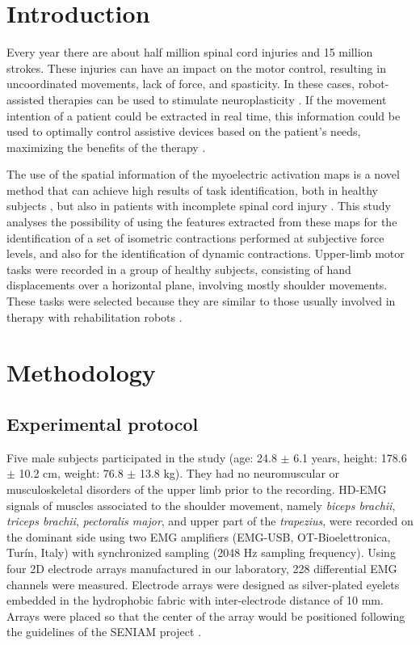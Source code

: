 \section{Introduction}
Every year there are about half million spinal cord injuries and 15 million strokes. These injuries can have an impact on the motor control, resulting in uncoordinated movements, lack of force, and spasticity. In these cases, robot-assisted therapies can be used to stimulate neuroplasticity \citep{vanPepen2004}. If the movement intention of a patient could be extracted in real time, this information could be used to optimally control assistive devices based on the patient's needs, maximizing the benefits of the therapy \citep{Hogan2006}.

The use of the spatial information of the myoelectric activation maps is a novel method that can achieve high results of task identification, both in healthy subjects \citep{Stango2015}, but also in patients with incomplete spinal cord injury \citep{Rojas-Martinez2013, Jordanic2016a, Jordanic2016b}. This study analyses the possibility of using the features extracted from these maps for the identification of a set of isometric contractions performed at subjective force levels, and also for the identification of dynamic contractions. Upper-limb motor tasks were recorded in a group of healthy subjects, consisting of hand displacements over a horizontal plane, involving mostly shoulder movements. These tasks were selected because they are similar to those usually involved in therapy with rehabilitation robots \citep{Badesa2014}.


\section{Methodology}

\subsection{Experimental protocol}
Five male subjects participated in the study (age: 24.8 $\pm$ 6.1 years, height: 178.6 $\pm$ 10.2 cm, weight: 76.8 $\pm$ 13.8 kg). They had no neuromuscular or musculoskeletal disorders of the upper limb prior to the recording. HD-EMG signals of muscles associated to the shoulder movement, namely \textit{biceps brachii}, \textit{triceps brachii}, \textit{pectoralis major}, and upper part of the \textit{trapezius}, were recorded on the dominant side using two EMG amplifiers (EMG-USB, OT-Bioelettronica, Tur\'in, Italy) with synchronized sampling (2048 Hz sampling frequency). Using four 2D electrode arrays manufactured in our laboratory, 228 differential EMG channels were measured. Electrode arrays were designed as silver-plated eyelets embedded in the hydrophobic fabric with inter-electrode distance of 10 mm. Arrays were placed so that the center of the array would be positioned following the guidelines of the SENIAM project \citep{Hermens1999}.

